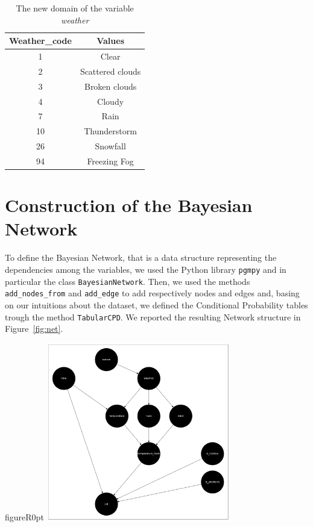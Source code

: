 \documentclass[letterpaper,11pt]{article}
\begin{document}
\begin{table}[!htb]
\centering
\begin{tabular}{cc} 
\hline
\multicolumn{1}{c}{Weather\_code} & \multicolumn{1}{c}{Values} \\
\hline
1 &   Clear \\
2 &  Scattered clouds  \\
3 & Broken clouds\\
4 & Cloudy\\
7 &   Rain \\
10 &  Thunderstorm  \\
26 & Snowfall\\
94 & Freezing Fog\\
\hline
\end{tabular}
\caption{The new domain of the variable \textit{weather}}
\label{tab:code}
\end{table}


\section{Construction of the Bayesian Network}

To define the Bayesian Network, that is a data structure 
representing the dependencies among the variables,  we used the Python library \texttt{pgmpy} and 
in particular the class \texttt{BayesianNetwork}. Then, we used the methods \texttt{add\_nodes\_from}
 and \texttt{add\_edge} to add respectively nodes and edges and,  basing on our intuitions about the dataset,
  we defined the Conditional Probability 
 tables trough the method \texttt{TabularCPD}.
We reported the resulting Network structure in Figure~\ref{fig:net}.

\begin{wrapfloat}{figure}{R}{0pt}
  \includegraphics[width=0.6\textwidth]{network.png}
  \caption{The Network structure}
  \label{fig:net}
  \end{wrapfloat}
\end{document}
